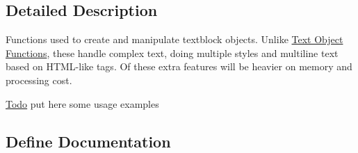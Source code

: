 \subsection{Detailed Description}
Functions used to create and manipulate textblock objects. Unlike \hyperlink{group__Evas__Object__Text}{Text Object Functions}, these handle complex text, doing multiple styles and multiline text based on HTML-\/like tags. Of these extra features will be heavier on memory and processing cost.

\begin{Desc}
\item[\hyperlink{todo__todo000006}{Todo}]put here some usage examples\end{Desc}


\subsection{Define Documentation}
